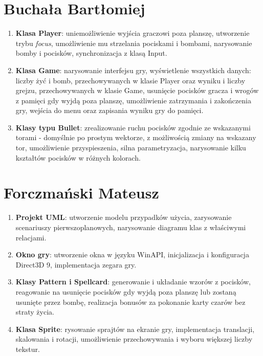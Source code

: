 \documentclass[a4paper,twoside]{article}
\begin{document}
	\section{Buchała Bartłomiej}
	\begin{enumerate}[label=\alph*.]
		\item \textbf{Klasa Player}: uniemożliwienie wyjścia graczowi poza planszę, utworzenie trybu \emph{focus}, umożliwienie mu strzelania pociskami i bombami, narysowanie bomby i pocisków, synchronizacja z klasą Input.
		\item \textbf{Klasa Game}: narysowanie interfejsu gry, wyświetlenie wszystkich danych: liczby żyć i bomb, przechowywanych w klasie Player oraz wyniku i liczby grejzu, przechowywanych w klasie Game, usunięcie pocisków gracza i wrogów z pamięci gdy wyjdą poza planszę, umożliwienie zatrzymania i zakończenia gry, wejścia do menu oraz zapisania wyniku gry do pamięci.
		\item \textbf{Klasy typu Bullet}: zrealizowanie ruchu pocisków zgodnie ze wskazanymi torami - domyślnie po prostym wektorze, z możliwością zmiany na wskazany tor, umożliwienie przyspieszenia, silna parametryzacja, narysowanie kilku kształtów pocisków w różnych kolorach.
	\end{enumerate}
	
	\section{Forczmański Mateusz}
		\begin{enumerate}[label=\alph*.]
		\item \textbf{Projekt UML}: utworzenie modelu przypadków użycia, zarysowanie scenariuszy pierwszoplanowych, narysowanie diagramu klas z właściwymi relacjami.
		\item \textbf{Okno gry}: utworzenie okna w języku WinAPI, inicjalizacja i konfiguracja Direct3D 9, implementacja zegara gry.
		\item \textbf{Klasy Pattern i Spellcard}: generowanie i układanie wzorów z pocisków, reagowanie na usunięcie pocisków gdy wyjdą poza planszę lub zostaną usunięte przez bombę, realizacja bonusów za pokonanie karty czarów bez straty życia.
		\item \textbf{Klasa Sprite}: rysowanie sprajtów na ekranie gry, implementacja translacji, skalowania i rotacji, umożliwienie przechowywania i wyboru większej liczby tekstur.
	\end{enumerate}
	
\end{document}
